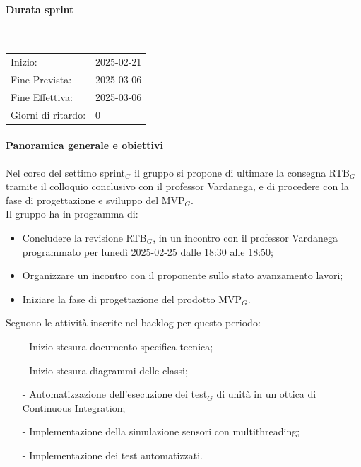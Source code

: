 \documentclass[10pt]{article}
\begin{document}
{{{{{{{        \paragraph{Durata sprint}\mbox{}\\
        \vspace{-1.5em}
        \begin{table}[h] 
        \renewcommand{\arraystretch}{1.2}  
        \begin{tabular}{ l l }
            Inizio: & 2025-02-21 \\
            Fine Prevista: & 2025-03-06 \\
            Fine Effettiva: & 2025-03-06 \\
            Giorni di ritardo: & 0 \\
        \end{tabular}
        \end{table}
        \vspace{-2em}
        {\renewcommand{\arraystretch}{1.5}%
        
        \paragraph{Panoramica generale e obiettivi}\mbox{}\vspace{0.4em}

        Nel corso del settimo sprint$_G$ il gruppo si propone di ultimare la consegna RTB$_G$ tramite il colloquio conclusivo con il professor 
        Vardanega, e di procedere con la fase di progettazione e sviluppo del MVP$_G$.
        \\
        Il gruppo ha in programma di:
        \begin{itemize}
            \item Concludere la revisione RTB$_G$, in un incontro con il professor Vardanega programmato per lunedì 2025-02-25 dalle 18:30 alle 18:50;
            \item Organizzare un incontro con il proponente sullo stato avanzamento lavori;
            \item Iniziare la fase di progettazione del prodotto MVP$_G$.
        \end{itemize}

        Seguono le attività inserite nel backlog per questo periodo:
        \vspace{-0.5em}
        \begin{itemize}
        \setlength\itemsep{-0.2em}
        \item [-] Inizio stesura documento specifica tecnica;
        \item [-] Inizio stesura diagrammi delle classi;
        \item [-] Automatizzazione dell'esecuzione dei test$_G$ di unità in un ottica di Continuous Integration;
        \item [-] Implementazione della simulazione sensori con multithreading;
        \item [-] Implementazione dei test automatizzati.
        \end{itemize}

}}}}}}}}
\end{document}

